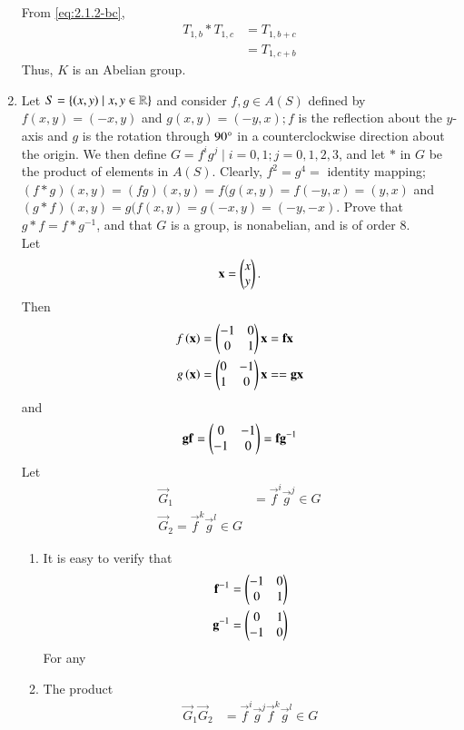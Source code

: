 \begin{enumerate}[label=\arabic*.,ref=\thesubsection.\theenumi]
		\\
		\solution  From \eqref{eq:2.1.2-bc},
		\begin{align}
T_{1,b}
*
			T_{1,c} &= 
T_{1,b+c}  
\\
			&= T_{1,c+b}  
		\end{align}
		Thus, $K$  is an Abelian group.
	\item 
		Let $S = \left\{(x, y) \mid x, y  \in \mathbb{R}\right\}$ and consider $f, g \in A(S)$ defined by $f (x, y) = (-x, y)$ and $g(x, y) = (-y, x); f$ is the reflection about the $y$-axis and $g$ is the rotation through $90\degree$ in a counterclockwise direction about the origin. We then define $G = f^ig^j 
\mid i = 0, 1; j = 0, 1, 2, 3$, and let $*$
in $G$ be the product of elements in $A(S)$. Clearly, $f^2 = g^4 = $ identity mapping; $(f* g)(x, y) = (fg)(x, y) = f(g(x, y) = f( - y, x) = (y, x)$
and $(g*f)(x,y) = g(f(x,y) = g(-x,y) = (-y, -x)$. Prove that $g * f = f * g^{-1}$, and that $G$ is a group, is nonabelian, and is of order 8.
\\
\solution Let 
\begin{align}
	\mathbf{x} = \begin{pmatrix}x \\ y\end{pmatrix}.
\end{align}
Then 
\begin{align}
	f\left(	\mathbf{x}\right) &= \begin{pmatrix}-1 & 0 \\ 0 & 1\end{pmatrix}\mathbf{x} = \mathbf{f}\mathbf{x}
	\\
	g\left(	\mathbf{x}\right) &= \begin{pmatrix}0 & -1 \\ 1 & 0\end{pmatrix}\mathbf{x} = = \mathbf{g}\mathbf{x}
\end{align}
and 
\begin{align}
	\mathbf{g}\mathbf{f} = \begin{pmatrix}0 & -1\\-1 & 0\end{pmatrix} =\mathbf{f}\mathbf{g}^{-1}
\end{align}
Let 
\begin{align}
	\vec{G}_1 &= \vec{f}^i\vec{g}^j \in G
	\\
	\vec{G}_2 = \vec{f}^k\vec{g}^l \in G
\end{align}

\begin{enumerate}
	\item It is easy to verify that 
\begin{align}
	\mathbf{f}^{-1} &= 	\begin{pmatrix}-1 & 0\\0 & 1\end{pmatrix}
		\\
	\mathbf{g}^{-1} &= 
	\begin{pmatrix}0  & 1\\-1 & 0\end{pmatrix}
\end{align}
For any 
	\item The product
\begin{align}
	\vec{G}_1 	\vec{G}_2&= \vec{f}^i\vec{g}^j 
  \vec{f}^k\vec{g}^l \in G
\end{align}
\end{enumerate}
\end{enumerate}
